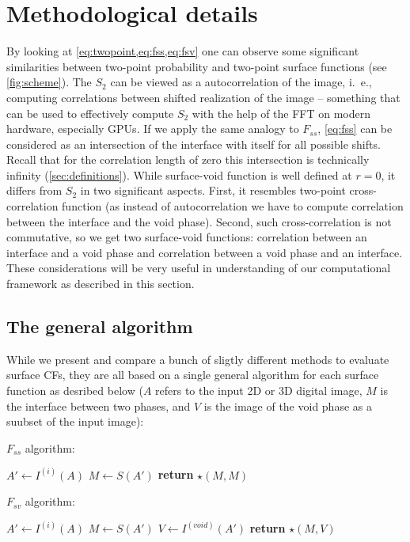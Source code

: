 \documentclass[reprint,amsmath,amssymb,aps,pre,showkeys,showpacs]{revtex4-1}
\begin{document}
\section{Methodological details}
\label{sec:details}
By looking at \cref{eq:twopoint,eq:fss,eq:fsv} one can observe
some significant similarities between two-point probability and two-point
surface functions (see \cref{fig:scheme}). The $S_2$ can be viewed as a
autocorrelation of the image, i.~e., computing correlations between shifted
realization of the image -- something that can be used to effectively compute
$S_2$ with the help of the FFT on modern hardware, especially GPUs. If we apply
the same analogy to $F_{ss}$, \cref{eq:fss} can be considered as an intersection
of the interface with itself for all possible shifts. Recall that for the
correlation length of zero this intersection is technically infinity
(\cref{sec:definitions}). While surface-void function is well defined at $r=0$,
it differs from $S_2$ in two significant aspects. First, it resembles two-point
cross-correlation function (as instead of autocorrelation we have to compute
correlation between the interface and the void phase). Second, such
cross-correlation is not commutative, so we get two surface-void functions:
correlation between an interface and a void phase and correlation between a void
phase and an interface. These considerations will be very useful in
understanding of our computational framework as described in this section.

\subsection{The general algorithm}
While we present and compare a bunch of sligtly different methods to evaluate
surface CFs, they are all based on a single general algorithm for each surface
function as desribed below ($A$ refers to the input 2D or 3D digital image, $M$
is the interface between two phases, and $V$ is the image of the void phase as a
suubset of the input image):

$F_{ss}$ algorithm:
\begin{algorithmic}[1]
  \State $A' \gets I^{(i)}(A)$
  \State $M \gets S(A')$
  \State \textbf{return} $\star(M, M)$
  \EndProcedure
\end{algorithmic}

$F_{sv}$ algorithm:
\begin{algorithmic}[1]
  \State $A' \gets I^{(i)}(A)$
  \State $M \gets S(A')$
  \State $V \gets I^{(void)}(A')$
  \State \textbf{return} $\star(M, V)$
  \EndProcedure
\end{algorithmic}
\end{document}
